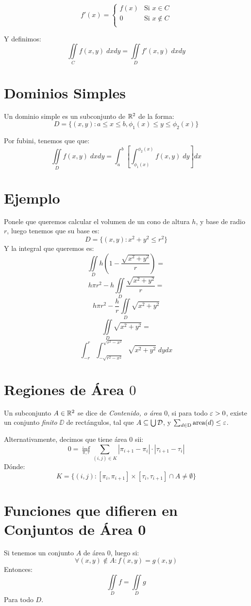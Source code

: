 \documentclass{article}
\begin{document}
\[
	f'(x) =
	\begin{cases}
		f(x) & \text{Si $x \in C$} \\
		0 & \text{Si $x \notin C$} \\
	\end{cases}
\]

Y definimos:
\[
	\iint\limits_C f(x,y) \; dxdy = \iint\limits_D f'(x,y) \; dxdy
\]

\section*{Dominios Simples}
Un dominio simple es un subconjunto de $\mathbb{R}^2$ de la forma:
\[D = \{(x,y) : a \leq x \leq b, \phi_1(x) \leq y \leq \phi_2(x)\}\]

Por fubini, tenemos que que:
\[
	\iint\limits_D f(x,y) \; dxdy = \int_a^b \left[\int_{\phi_1(x)}^{\phi_2(x)} f(x,y) \; dy\right] dx
\]
\section*{Ejemplo}
Ponele que queremos calcular el volumen de un cono de altura $h$, y base de radio $r$, luego tenemos que su base es:
\[D = \{(x,y) : x^2 + y^2 \leq r^2\}\]
Y la integral que queremos es:
\[\iint\limits_D h \left(1 - \frac{\sqrt{x^2 + y^2}}{r}\right) =\]
\[h \pi r^2 - h\iint\limits_D \frac{\sqrt{x^2 + y^2}}{r} =\]
\[h \pi r^2 - \frac{h}{r}\iint\limits_D \sqrt{x^2 + y^2}\]
\[\iint\limits_D \sqrt{x^2 + y^2} =\]
\[\int_{-r}^r \int_{-\sqrt{r^2-x^2}}^{\sqrt{r^2-x^2}} \sqrt{x^2 + y^2} \; dydx\]

\section*{Regiones de Área $0$}
Un subconjunto $A \in \mathbb{R}^2$ se dice de \emph{Contenido, o área $0$}, si para todo $\varepsilon > 0$, existe un conjunto \emph{finito} $\DD$ de rectángulos, tal que $A \subseteq \bigcup \mathcal{D}$, y $\sum_{d \in \operatorname{D}} \text{area}(d) \leq \varepsilon$.

Alternativamente, decimos que tiene área 0 sii:
\[0 = \inf_{\pi, \tau} \sum_{(i,j) \in K} |\pi_{i+1} - \pi_i| \cdot |\tau_{i+1} - \tau_i|\]
Dónde:
\[K = \{(i,j) : [\pi_i, \pi_{i+1}] \times [\tau_i, \tau_{i+1}] \cap A \neq \emptyset\}\]

\section*{Funciones que difieren en Conjuntos de Área 0}
Si tenemos un conjunto $A$ de área $0$, luego si:
\[\forall (x,y) \notin A : f(x,y) = g(x,y)\]
Entonces:
\[\iint\limits_D f = \iint\limits_D g\]
Para todo $D$.
\end{document}

